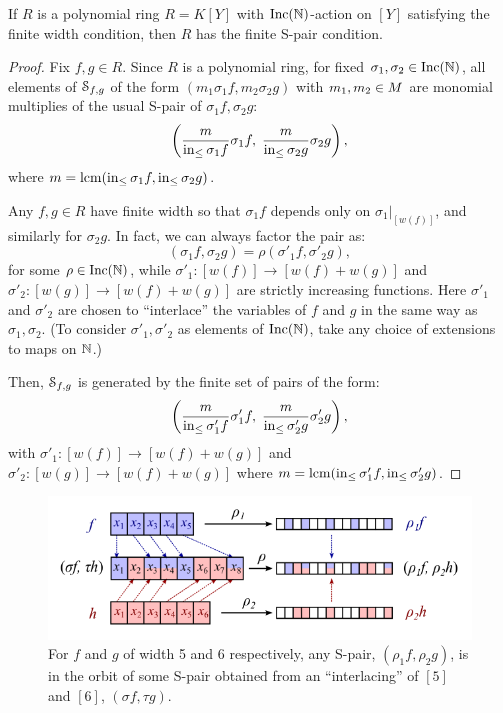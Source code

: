 \begin{proposition}
 If $R$ is a polynomial ring $R = K[Y]$ with $\operatorname{Inc}(\mathbb N)$-action on $[Y]$ satisfying the finite width condition, then $R$ has the finite S-pair condition.
\end{proposition}
\begin{proof}
 Fix $f,g \in R$.
 Since $R$ is a polynomial ring, for fixed $\sigma_1,\sigma_2 \in \operatorname{Inc}(\mathbb N)$, all elements of $\mathcal S_{f,g}$ of the form $(m_1\sigma_1 f, m_2\sigma_2 g)$ with $m_1,m_2 \in M$ are monomial multiplies of the usual S-pair of $\sigma_1 f, \sigma_2 g$:
  \[ \left(\frac{m}{\operatorname{in}_{\leq} \sigma_1 f} \sigma_1 f,\; \frac{m}{\operatorname{in}_{\leq} \sigma_2 g} \sigma_2 g\right),\]
 where $m = \operatorname{lcm}(\operatorname{in}_{\leq} \sigma_1 f,\operatorname{in}_{\leq} \sigma_2 g)$.

 Any $f,g \in R$ have finite width so that $\sigma_1 f$ depends only on $\sigma_1|_{[w(f)]}$, and similarly for $\sigma_2 g$.  In fact, we can always factor the pair as:
  \[ (\sigma_1 f, \sigma_2 g) = \rho(\sigma'_1 f, \sigma'_2 g),\]
 for some $\rho \in \operatorname{Inc}(\mathbb N)$, while $\sigma'_1:[w(f)] \to [w(f) + w(g)]$ and $\sigma'_2:[w(g)] \to [w(f) + w(g)]$ are strictly increasing functions.  Here $\sigma'_1$ and $\sigma'_2$ are chosen to ``interlace'' the variables of $f$ and $g$ in the same way as $\sigma_1,\sigma_2$.  (To consider $\sigma'_1,\sigma'_2$ as elements of $\operatorname{Inc}(\mathbb N)$, take any choice of extensions to maps on $\mathbb N$.)
 
 Then, $\mathcal S_{f,g}$ is generated by the finite set of pairs of the form:
  \[ \left(\frac{m}{\operatorname{in}_{\leq} \sigma'_1 f} \sigma'_1 f,\; \frac{m}{\operatorname{in}_{\leq} \sigma'_2 g} \sigma'_2 g\right),\]
 with $\sigma'_1:[w(f)] \to [w(f) + w(g)]$ and $\sigma'_2:[w(g)] \to [w(f) + w(g)]$ where $m = \operatorname{lcm}(\operatorname{in}_{\leq} \sigma'_1 f,\operatorname{in}_{\leq} \sigma'_2 g)$.
\end{proof}
\begin{figure}[ht]\label{fig:interlace}
  \centering
  \includegraphics[width=.9\columnwidth]{incmap.pdf}
  \caption{For $f$ and $g$ of width 5 and 6 respectively, any S-pair, $(\rho_1 f,\rho_2 g)$, is in the orbit of some S-pair obtained from an ``interlacing'' of $[5]$ and $[6]$, $(\sigma f,\tau g)$.}
\end{figure}

